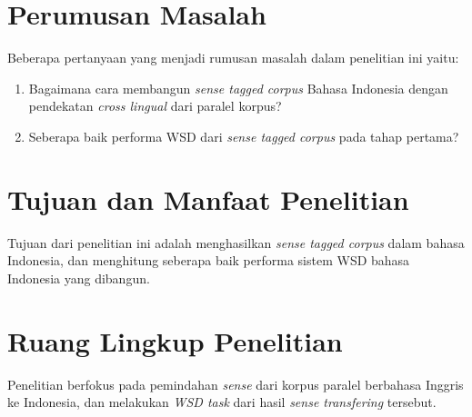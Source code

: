 \section{Perumusan Masalah}
Beberapa pertanyaan yang menjadi rumusan masalah dalam penelitian ini yaitu:
\begin{enumerate}
	\item Bagaimana cara membangun \textit{sense tagged corpus} Bahasa Indonesia dengan pendekatan \textit{cross lingual} dari paralel korpus?
	\item Seberapa baik performa WSD dari \textit{sense tagged corpus} pada tahap pertama?
\end{enumerate}

\section{Tujuan dan Manfaat Penelitian}
Tujuan dari penelitian ini adalah menghasilkan \textit{sense tagged corpus} dalam bahasa Indonesia, dan menghitung seberapa baik performa sistem WSD bahasa Indonesia yang dibangun.
\section{Ruang Lingkup Penelitian}
Penelitian berfokus pada pemindahan \textit{sense} dari korpus paralel berbahasa Inggris ke Indonesia, dan melakukan \textit{WSD task} dari hasil \textit{sense transfering} tersebut.
